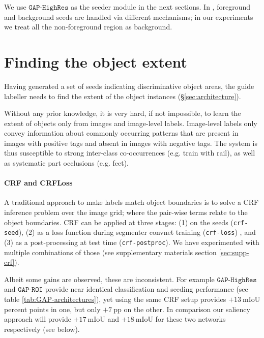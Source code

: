 \documentclass[british,10pt,twocolumn,letterpaper]{article}
\begin{document}
 We use $\mathtt{GAP}\text{-}\mathtt{HighRes}$ as the seeder module
 in the next sections. In \cite{kolesnikov2016seed}, foreground and
 background seeds are handled via different mechanisms; in our experiments
 we treat all the non-foreground region as background.

\section{\label{sec:object-extent}Finding the object extent}


Having generated a set of seeds indicating discriminative object areas,
the guide labeller needs to find the extent of the object instances
(\S\ref{sec:architecture}). 

Without any prior knowledge, it is very hard, if not impossible, to
learn the extent of objects only from images and image-level labels.
Image-level labels only convey information about commonly occurring
patterns that are present in images with positive tags and absent
in images with negative tags. The system is thus susceptible to strong
inter-class co-occurrences (e.g. train with rail), as well as systematic
part occlusions (e.g. feet).


\paragraph{\label{subsec:CRF-and-CRFLoss}CRF and CRFLoss}

A traditional approach to make labels match object boundaries is to
solve a CRF inference problem \cite{Lafferty2001ICML,Kraehenbuehl2011Nips}
over the image grid; where the pair-wise terms relate to the object boundaries.
CRF can be applied at three stages: (1) on the seeds (\texttt{crf-seed}),
(2) as a loss function during segmenter convnet training (\texttt{crf-loss})
\cite{kolesnikov2016seed}, and (3) as a post-processing at test time
(\texttt{crf-postproc}). We have experimented with multiple combinations
of those (see supplementary materials section \ref{sec:supp-crf}). 

Albeit some gains are observed, these are inconsistent. For example
$\mathtt{GAP}\text{-}\mathtt{HighRes}$ and $\mathtt{GAP}\text{-}\mathtt{ROI}$
provide near identical classification and seeding performance (see
table \ref{tab:GAP-architectures}), yet using the same CRF setup
provides $+13\ \mbox{mIoU}$ percent points in one, but only $+7\ \mbox{pp}$
on the other. In comparison our saliency approach will provide $+17\ \mbox{mIoU}$
and $+18\ \mbox{mIoU}$ for these two networks respectively (see below).
\end{document}
